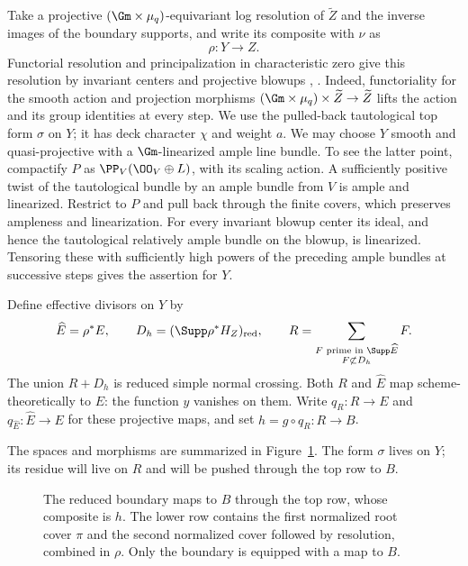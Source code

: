 Take a projective $(\Gm\times\mu_q)$-equivariant log resolution of
$\widetilde Z$ and the inverse images of the boundary supports, and
write its composite with $\nu$ as
\[
 \rho:Y\longrightarrow Z.
\]
Functorial resolution and principalization in characteristic zero
give this resolution by invariant centers and projective blowups
\cite[Theorem~1.1]{BierstoneMilman2008},
\cite[Theorem~1.0.1]{Wlodarczyk2005}.
Indeed, functoriality for the smooth action and projection morphisms
$(\Gm\times\mu_q)\times\widetilde Z\to\widetilde Z$ lifts the action
and its group identities at every step.
We use the pulled-back tautological top form
$\sigma$ on $Y$; it has deck character $\chi$ and weight $a$.
We may choose $Y$ smooth and quasi-projective with a $\Gm$-linearized
ample line bundle.  To see the latter point, compactify $P$ as
$\PP_V(\OO_V\oplus L)$, with its scaling action.  A sufficiently
positive twist of the tautological bundle by an ample bundle from
$V$ is ample and linearized.  Restrict to $P$ and pull back through
the finite covers, which preserves ampleness and linearization.
For every invariant blowup center its ideal, and hence the
tautological relatively ample bundle on the blowup, is linearized.
Tensoring these with sufficiently high powers of the preceding ample
bundles at successive steps gives the assertion for $Y$.

Define effective divisors on $Y$ by
\begin{equation}\label{bl:cov:resolved-boundary}
 \widehat E=\rho^*E,\qquad
 D_h=(\Supp\rho^*H_Z)_{\mathrm{red}},\qquad
 R=\sum_{\substack{F\text{ prime in }\Supp\widehat E\\
                         F\not\subset D_h}} F.
\end{equation}
The union $R+D_h$ is reduced simple normal crossing.  Both $R$ and
$\widehat E$ map scheme-theoretically to $E$: the function $y$ vanishes
on them.  Write $q_R:R\to E$ and $q_{\widehat E}:\widehat E\to E$ for
these projective maps, and set $h=g\circ q_R:R\to B$.

The spaces and morphisms are summarized in Figure~\ref{fig:boundary-covers}.
The form $\sigma$ lives on $Y$; its residue will live on $R$ and will
be pushed through the top row to $B$.
\begin{figure}[ht]
\centering
{}
\caption{The reduced boundary maps to $B$ through the top row, whose
composite is $h$. The lower row contains the first normalized root
cover $\pi$ and the second normalized cover followed by resolution,
combined in $\rho$. Only the boundary is equipped with a map to $B$.}
\label{fig:boundary-covers}
\end{figure}

